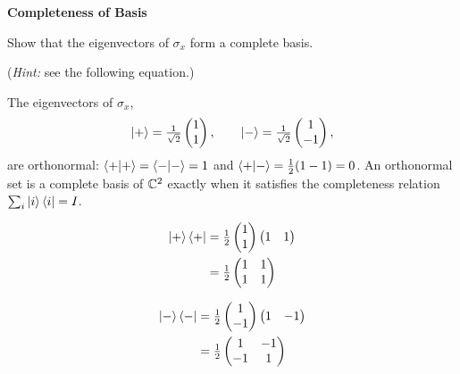 \documentclass[a4paper, 10pt]{article}
\begin{document}
\begin{problem}
\textbf{Completeness of Basis}
\par Show that the eigenvectors of \( \sigma_x \) form a complete basis.
\par (\textit{Hint:} see the following equation.)
\end{problem}

\begin{solution}
	\noindent The eigenvectors of \( \sigma_x \),
	\[
		\ket{+} = \tfrac{1}{\sqrt{2}}\begin{pmatrix} 1 \\ 1 \end{pmatrix}, \qquad
		\ket{-} = \tfrac{1}{\sqrt{2}}\begin{pmatrix} 1 \\ -1 \end{pmatrix},
	\]
	are orthonormal: \( \braket{+ \vert +} = \braket{- \vert -} = 1 \) and \( \braket{+ \vert -} = \tfrac{1}{2}(1 - 1) = 0 \).
	An orthonormal set is a complete basis of \( \mathbb{C}^2 \) exactly when it satisfies the completeness relation \( \sum_i \ket{i}\bra{i} = I \).

	\noindent
	\begin{minipage}[t]{0.46\textwidth}
		\begin{align*}
			\ket{+}\bra{+}
			 & = \tfrac{1}{2}\begin{pmatrix} 1 \\ 1 \end{pmatrix}\begin{pmatrix} 1 & 1 \end{pmatrix} \\
			 & = \tfrac{1}{2}\begin{pmatrix} 1 & 1 \\ 1 & 1 \end{pmatrix}
		\end{align*}
	\end{minipage}%
	\hfill \vrule \hfill
	\begin{minipage}[t]{0.46\textwidth}
		\begin{align*}
			\ket{-}\bra{-}
			 & = \tfrac{1}{2}\begin{pmatrix} 1 \\ -1 \end{pmatrix}\begin{pmatrix} 1 & -1 \end{pmatrix} \\
			 & = \tfrac{1}{2}\begin{pmatrix} 1 & -1 \\ -1 & 1 \end{pmatrix}
		\end{align*}
	\end{minipage}


\end{solution}
\end{document}
